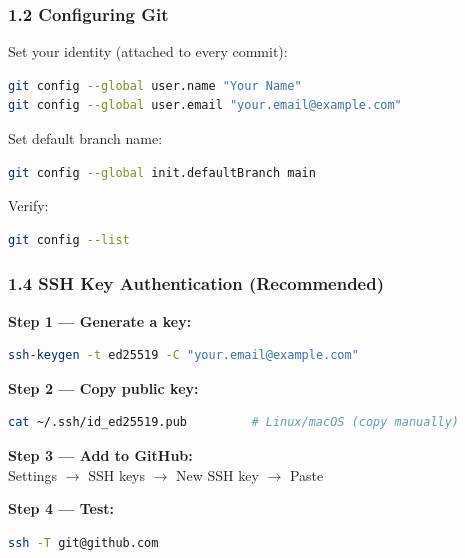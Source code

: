 \documentclass{beamer}
\begin{document}
\begin{frame}[fragile]
\frametitle{1.2 Configuring Git}

Set your identity (attached to every commit):
\begin{lstlisting}[language=bash]
git config --global user.name "Your Name"
git config --global user.email "your.email@example.com"
\end{lstlisting}

Set default branch name:
\begin{lstlisting}[language=bash]
git config --global init.defaultBranch main
\end{lstlisting}


Verify:
\begin{lstlisting}[language=bash]
git config --list
\end{lstlisting}
\end{frame}


\begin{frame}[fragile]
\frametitle{1.4 SSH Key Authentication (Recommended)}

\textbf{Step 1 --- Generate a key:}
\begin{lstlisting}[language=bash]
ssh-keygen -t ed25519 -C "your.email@example.com"
\end{lstlisting}

% 

\textbf{Step 2 --- Copy public key:}
\begin{lstlisting}[language=bash]
cat ~/.ssh/id_ed25519.pub         # Linux/macOS (copy manually)
\end{lstlisting}

\textbf{Step 3 --- Add to GitHub:}\\
Settings $\rightarrow$ SSH keys $\rightarrow$ New SSH key $\rightarrow$ Paste

\textbf{Step 4 --- Test:}
\begin{lstlisting}[language=bash]
ssh -T git@github.com
\end{lstlisting}
\end{frame}
\end{document}
